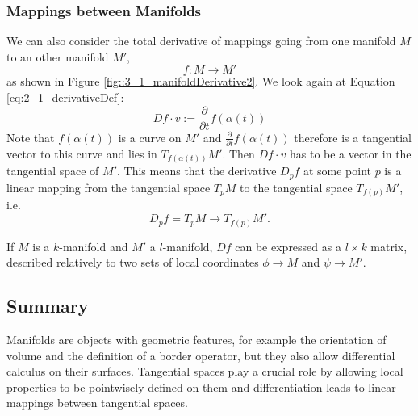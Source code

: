  
\subsubsection*{Mappings between Manifolds}
\label{sec:derivativeBetweenMfs}
We can also consider the total derivative of mappings going from one manifold $M$ to an other manifold $M'$,
\[f:M\to M'\]
as shown in Figure \ref{fig::3_1_manifoldDerivative2}. We look again at Equation \ref{eq:2_1_derivativeDef}:
\[Df \cdot v := \frac{\partial}{\partial t} f(\alpha(t))\]
Note that $f(\alpha(t))$ is a curve on $M'$ and $\frac{\partial}{\partial t}f(\alpha(t))$ therefore is a tangential vector to this curve and lies in $T_{f(\alpha(t))}M'$. Then $Df\cdot v$ has to be a vector in the tangential space of $M'$. This means that the derivative $D_pf$ at some point $p$ is a linear mapping from the tangential space $T_pM$  to the tangential space $T_{f(p)} M'$, i.e. 
\[D_p f = T_p M \rightarrow T_{f(p)} M'.\] 

If $M$ is a $k$-manifold and $M'$ a $l$-manifold, $Df$ can be expressed as a $l\times k$ matrix, described relatively to two sets of local coordinates $\phi \rightarrow M$ and $\psi \rightarrow M'$.

\subsection{Summary}
Manifolds are objects with geometric features, for example the orientation of volume and the definition of a border operator, but they also allow differential calculus on their surfaces. Tangential spaces play a crucial role by allowing local properties to be pointwisely defined on them and differentiation leads to linear mappings between tangential spaces.

